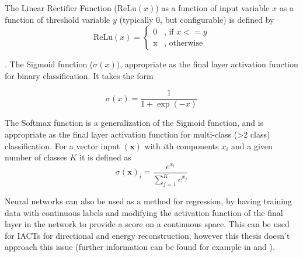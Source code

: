The Linear Rectifier Function ($\textrm{ReLu}(x)$) as a function of input variable $x$ as a function of threshold variable $y$ (typically 0, but configurable) is defined by
\begin{equation}
    \textrm{ReLu}(x)=\begin{cases}\mbox{0} & \mbox{, if } x <= y \\ \mbox{x} & \mbox{, otherwise} \end{cases}
\end{equation}

\cite{Keras}. The Sigmoid function ($\sigma(x)$), appropriate as the final layer activation function for binary classification. It takes the form

\begin{equation}
    \sigma(x)=\frac{1}{1+\exp(-x)}
\end{equation}

The Softmax function is a generalization of the Sigmoid function, and is appropriate as the final layer activation function for multi-class (>2 class) classification. For a vector input $(\textbf{x})$ with $i$th components $x_i $ and a given number of classes $K$ it is defined as
\begin{equation}
    \sigma(\textbf{x})_i=\frac{e^{x_i}}{\sum_{j=1}^K e^{x_j}}
\end{equation}

Neural networks can also be used as a method for regression, by having training data with continuous labels and modifying the activation function of the final layer in the network to provide a score on a continuous space. This can be used for IACTs for directional and energy reconstruction, however this thesis doesn't approach this issue (further information can be found for example in \cite{mikaelphd} and \cite{tjarkicrc}).  

